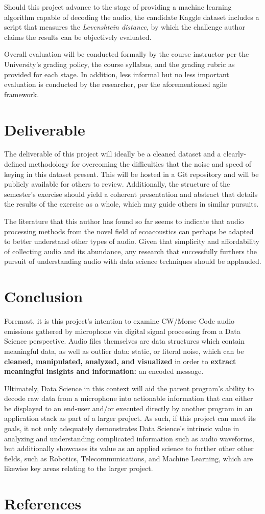 \documentclass[11pt]{article}
\begin{document}
Should this project advance to the stage of providing a machine learning algorithm capable of decoding the audio, the candidate Kaggle dataset includes a script that measures the
\emph{Levenshtein distance}, by which the challenge author claims the results can be objectively evaluated.

Overall evaluation will be conducted formally by the course instructor per the University's grading policy,
the course syllabus, and the grading rubric as provided for each stage. In addition, less informal but no less
important evaluation is conducted by the researcher, per the aforementioned agile framework.
\section{Deliverable}
\label{sec:orgb044501}
The deliverable of this project will ideally be a cleaned dataset and a clearly-defined methodology for overcoming the difficulties that the
noise and speed of keying in this dataset present. This will be hosted in a Git repository and will be publicly available for others to review.
Additionally, the structure of the semester's exercise should yield a coherent presentation and abstract that details the results of the
exercise as a whole, which may guide others in similar pursuits.

The literature that this author has found so far seems to indicate that audio processing methods from the novel field of ecoacoustics can perhaps
be adapted to better understand other types of audio. Given that simplicity and affordability of collecting audio and its abundance,
any research that successfully furthers the pursuit of understanding audio with data science techniques should be applauded.
\section{Conclusion}
\label{sec:org36c5a97}
Foremost, it is this project's intention to examine CW/Morse Code audio emissions gathered by microphone via digital signal processing
from a Data Science perspective. Audio files themselves are data structures which contain meaningful data, as well as outlier data: static, or literal noise, which can be
\textbf{cleaned, manipulated, analyzed, and visualized} in order to \textbf{extract meaningful insights and information:} an encoded message.

Ultimately, Data Science in this context will aid the parent program's ability to decode raw data from a microphone into actionable information that can either be displayed to an end-user
and/or executed directly by another program in an application stack as part of a larger project. As such, if this project can meet its goals, it not only adequately demonstrates
Data Science's intrinsic value in analyzing and understanding complicated information such as audio waveforms, but additionally showcases its value as an applied science to further other
other fields, such as Robotics, Telecommunications, and Machine Learning, which are likewise key areas relating to the larger project.
\section{References}
\label{sec:orge19f71a}
\printbibliography
\end{document}
